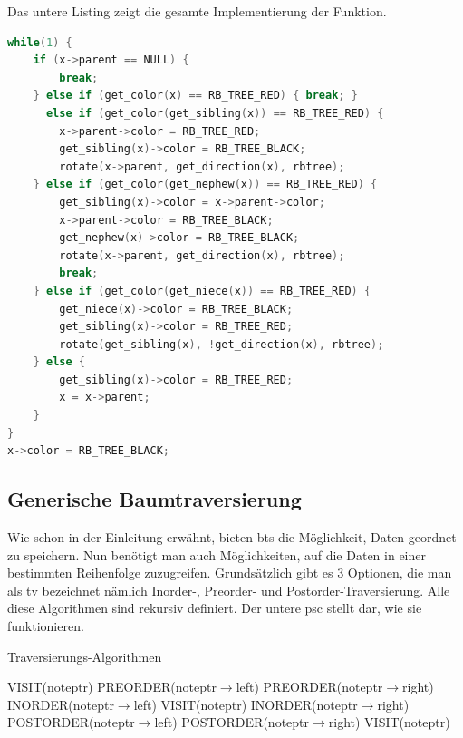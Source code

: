 \documentclass[11pt]{article}
\begin{document}
Das untere Listing zeigt die gesamte Implementierung der Funktion.

\begin{lstlisting}[language=C]
while(1) {
    if (x->parent == NULL) {
        break;
    } else if (get_color(x) == RB_TREE_RED) { break; } 
      else if (get_color(get_sibling(x)) == RB_TREE_RED) {
        x->parent->color = RB_TREE_RED;
        get_sibling(x)->color = RB_TREE_BLACK;
        rotate(x->parent, get_direction(x), rbtree);
    } else if (get_color(get_nephew(x)) == RB_TREE_RED) {
        get_sibling(x)->color = x->parent->color;
        x->parent->color = RB_TREE_BLACK;
        get_nephew(x)->color = RB_TREE_BLACK;
        rotate(x->parent, get_direction(x), rbtree);
        break;
    } else if (get_color(get_niece(x)) == RB_TREE_RED) {
        get_niece(x)->color = RB_TREE_BLACK;
        get_sibling(x)->color = RB_TREE_RED;
        rotate(get_sibling(x), !get_direction(x), rbtree);
    } else {
        get_sibling(x)->color = RB_TREE_RED;
        x = x->parent;
    }
}
x->color = RB_TREE_BLACK;
\end{lstlisting}
\cite{YTDelete}

\subsection{Generische Baumtraversierung} \label{tr}
Wie schon in der Einleitung erwähnt, bieten \glspl{bt} die Möglichkeit, Daten geordnet zu speichern. Nun benötigt man auch Möglichkeiten, auf die Daten in einer bestimmten Reihenfolge zuzugreifen. Grundsätzlich gibt es 3 Optionen, die man als \gls{tv} bezeichnet nämlich Inorder-, Preorder- und Postorder-Traversierung.
Alle diese Algorithmen sind rekursiv definiert. \cite[S. 44ff]{aic}  Der untere \gls{psc} stellt dar, wie sie funktionieren.

\begin{algorithm}
  \caption{Traversierungs-Algorithmen}
  \begin{algorithmic}[1]
      \Return
    \EndIf
    \State VISIT(noteptr)
    \State PREORDER(noteptr$\rightarrow$left)
    \State PREORDER(noteptr$\rightarrow$right)
  \EndProcedure
      \Return
    \EndIf
    \State INORDER(noteptr$\rightarrow$left)
    \State VISIT(noteptr)
    \State INORDER(noteptr$\rightarrow$right)
  \EndProcedure
      \Return
    \EndIf
    \State POSTORDER(noteptr$\rightarrow$left)
    \State POSTORDER(noteptr$\rightarrow$right)
    \State VISIT(noteptr)
  \EndProcedure
  \end{algorithmic}
\end{algorithm}
\cite[S. 318ff]{aop}
\end{document}
